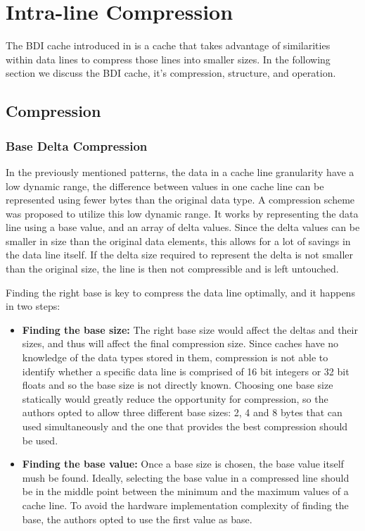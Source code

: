 
\section{Intra-line Compression}
\label{sec:BDI}
The BDI cache introduced in \cite{bdi} is a cache that takes advantage of similarities within data lines to compress those lines into smaller sizes. In the following section we discuss the BDI cache, it's compression, structure, and operation.
\subsection{Compression}
\label{Compression}
\subsubsection{Base Delta Compression}
In the previously mentioned patterns, the data in a cache line granularity have a low dynamic range, the difference between values in one cache line can be represented using fewer bytes than the original data type. A compression scheme was proposed to utilize this low dynamic range. It works by representing the data line using a base value, and an array of delta values. Since the delta values can be smaller in size than the original data elements, this allows for a lot of savings in the data line itself. If the delta size required to represent the delta is not smaller than the original size, the line is then not compressible and is left untouched.\par
Finding the right base is key to compress the data line optimally, and it happens in two steps:
\begin{itemize}
    \item \textbf{Finding the base size:} The right base size would affect the deltas and their sizes, and thus will affect the final compression size. Since caches have no knowledge of the data types stored in them, compression is not able to identify whether a specific data line is comprised of 16 bit integers or 32 bit floats and so the base size is not directly known. Choosing one base size statically would greatly reduce the opportunity for compression, so the authors opted to allow three different base sizes: 2, 4 and 8 bytes that can used simultaneously and the one that provides the best compression should be used.
    \item \textbf{Finding the base value:} Once a base size is chosen, the base value itself mush be found. Ideally, selecting the base value in a compressed line should be in the middle point between the minimum and the maximum values of a cache line. To avoid the hardware implementation complexity of finding the base, the authors opted to use the first value as base.
\end{itemize}

